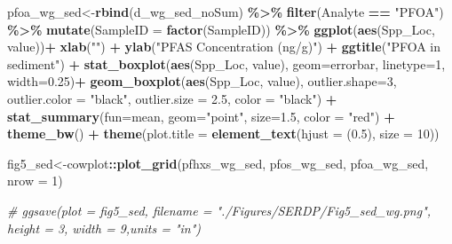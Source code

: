 \documentclass[
]{article}
\newenvironment{Shaded}{\begin{snugshade}}{\end{snugshade}}
\newcommand{\AttributeTok}[1]{\textcolor[rgb]{0.13,0.29,0.53}{#1}}
\newcommand{\CommentTok}[1]{\textcolor[rgb]{0.56,0.35,0.01}{\textit{#1}}}
\newcommand{\DecValTok}[1]{\textcolor[rgb]{0.00,0.00,0.81}{#1}}
\newcommand{\FloatTok}[1]{\textcolor[rgb]{0.00,0.00,0.81}{#1}}
\newcommand{\FunctionTok}[1]{\textcolor[rgb]{0.13,0.29,0.53}{\textbf{#1}}}
\newcommand{\NormalTok}[1]{#1}
\newcommand{\OtherTok}[1]{\textcolor[rgb]{0.56,0.35,0.01}{#1}}
\newcommand{\SpecialCharTok}[1]{\textcolor[rgb]{0.81,0.36,0.00}{\textbf{#1}}}
\newcommand{\StringTok}[1]{\textcolor[rgb]{0.31,0.60,0.02}{#1}}
\begin{document}
\begin{Shaded}
\begin{Highlighting}[]
\NormalTok{pfoa\_wg\_sed}\OtherTok{\textless{}{-}}\FunctionTok{rbind}\NormalTok{(d\_wg\_sed\_noSum) }\SpecialCharTok{\%\textgreater{}\%} 
  \FunctionTok{filter}\NormalTok{(Analyte }\SpecialCharTok{==} \StringTok{"PFOA"}\NormalTok{) }\SpecialCharTok{\%\textgreater{}\%} 
  \FunctionTok{mutate}\NormalTok{(}\AttributeTok{SampleID =} \FunctionTok{factor}\NormalTok{(SampleID)) }\SpecialCharTok{\%\textgreater{}\%} 
  \FunctionTok{ggplot}\NormalTok{(}\FunctionTok{aes}\NormalTok{(Spp\_Loc, value))}\SpecialCharTok{+}
    \FunctionTok{xlab}\NormalTok{(}\StringTok{""}\NormalTok{) }\SpecialCharTok{+}
    \FunctionTok{ylab}\NormalTok{(}\StringTok{"PFAS Concentration (ng/g)"}\NormalTok{) }\SpecialCharTok{+}
    \FunctionTok{ggtitle}\NormalTok{(}\StringTok{"PFOA in sediment"}\NormalTok{) }\SpecialCharTok{+}
    \FunctionTok{stat\_boxplot}\NormalTok{(}\FunctionTok{aes}\NormalTok{(Spp\_Loc, value),}
                 \AttributeTok{geom=}\StringTok{\textquotesingle{}errorbar\textquotesingle{}}\NormalTok{, }\AttributeTok{linetype=}\DecValTok{1}\NormalTok{, }\AttributeTok{width=}\FloatTok{0.25}\NormalTok{)}\SpecialCharTok{+}
    \FunctionTok{geom\_boxplot}\NormalTok{(}\FunctionTok{aes}\NormalTok{(Spp\_Loc, value),}
                 \AttributeTok{outlier.shape=}\DecValTok{3}\NormalTok{,}
                 \AttributeTok{outlier.color =} \StringTok{"black"}\NormalTok{,}
                 \AttributeTok{outlier.size =} \FloatTok{2.5}\NormalTok{,}
                 \AttributeTok{color =} \StringTok{"black"}\NormalTok{) }\SpecialCharTok{+} 
    \FunctionTok{stat\_summary}\NormalTok{(}\AttributeTok{fun=}\NormalTok{mean, }\AttributeTok{geom=}\StringTok{"point"}\NormalTok{, }\AttributeTok{size=}\FloatTok{1.5}\NormalTok{, }\AttributeTok{color =} \StringTok{"red"}\NormalTok{) }\SpecialCharTok{+}
    \FunctionTok{theme\_bw}\NormalTok{() }\SpecialCharTok{+}
    \FunctionTok{theme}\NormalTok{(}\AttributeTok{plot.title =} \FunctionTok{element\_text}\NormalTok{(}\AttributeTok{hjust =}\NormalTok{ (}\FloatTok{0.5}\NormalTok{), }\AttributeTok{size =} \DecValTok{10}\NormalTok{))}

\NormalTok{fig5\_sed}\OtherTok{\textless{}{-}}\NormalTok{cowplot}\SpecialCharTok{::}\FunctionTok{plot\_grid}\NormalTok{(pfhxs\_wg\_sed, pfos\_wg\_sed, pfoa\_wg\_sed, }
                   \AttributeTok{nrow =} \DecValTok{1}\NormalTok{)}

\CommentTok{\# ggsave(plot = fig5\_sed, filename = "./Figures/SERDP/Fig5\_sed\_wg.png", height = 3, width = 9,units = "in")}
\end{Highlighting}
\end{Shaded}
\end{document}
